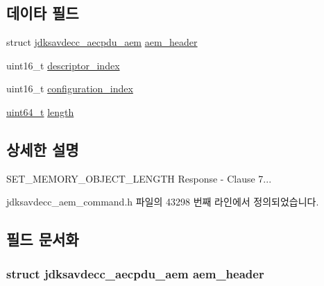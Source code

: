 \subsection*{데이타 필드}
\begin{DoxyCompactItemize}
\item 
struct \hyperlink{structjdksavdecc__aecpdu__aem}{jdksavdecc\+\_\+aecpdu\+\_\+aem} \hyperlink{structjdksavdecc__aem__command__set__memory__object__length__response_ae1e77ccb75ff5021ad923221eab38294}{aem\+\_\+header}
\item 
uint16\+\_\+t \hyperlink{structjdksavdecc__aem__command__set__memory__object__length__response_a042bbc76d835b82d27c1932431ee38d4}{descriptor\+\_\+index}
\item 
uint16\+\_\+t \hyperlink{structjdksavdecc__aem__command__set__memory__object__length__response_afaad1bd7c66f9611e134d8c5ce98f444}{configuration\+\_\+index}
\item 
\hyperlink{parse_8c_aec6fcb673ff035718c238c8c9d544c47}{uint64\+\_\+t} \hyperlink{structjdksavdecc__aem__command__set__memory__object__length__response_a190b76b1f3d5bd26920300e5f073739b}{length}
\end{DoxyCompactItemize}


\subsection{상세한 설명}
S\+E\+T\+\_\+\+M\+E\+M\+O\+R\+Y\+\_\+\+O\+B\+J\+E\+C\+T\+\_\+\+L\+E\+N\+G\+TH Response -\/ Clause 7... 

jdksavdecc\+\_\+aem\+\_\+command.\+h 파일의 43298 번째 라인에서 정의되었습니다.



\subsection{필드 문서화}
\subsubsection[{\texorpdfstring{aem\+\_\+header}{aem_header}}]{\setlength{\rightskip}{0pt plus 5cm}struct {\bf jdksavdecc\+\_\+aecpdu\+\_\+aem} aem\+\_\+header}\hypertarget{structjdksavdecc__aem__command__set__memory__object__length__response_ae1e77ccb75ff5021ad923221eab38294}{}\label{structjdksavdecc__aem__command__set__memory__object__length__response_ae1e77ccb75ff5021ad923221eab38294}



